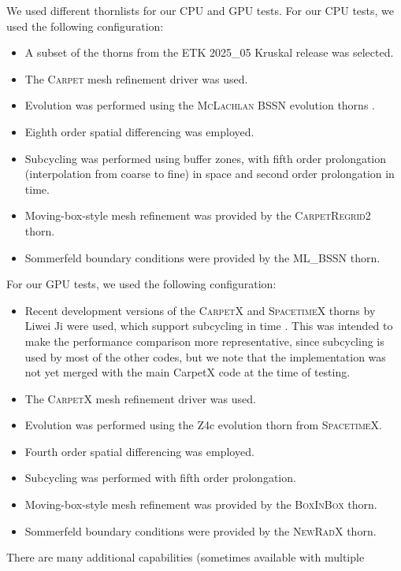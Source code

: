 \documentclass[12pt,a4paper]{article}
\numberwithin{figure}{subsection}
\newcommand{\etk}{\textsc{ETK}\xspace} %
\newcommand{\carpet}{\textsc{Carpet}\xspace}
\newcommand{\carpetx}{\textsc{CarpetX}\xspace}
\begin{document}
We used different thornlists for our CPU and GPU tests. For our CPU tests, we
used the following configuration:
\begin{itemize}
    \item A subset of the thorns from the \etk 2025\_05 Kruskal release
    \cite{EinsteinToolkit:2025_05} was selected.
    \item The \carpet mesh refinement driver was used.
    \item Evolution was performed using the \textsc{McLachlan} BSSN evolution
    thorns \cite{Brown:2008sb,Husa:2004ip}.
    \item Eighth order spatial differencing was employed.
    \item Subcycling was performed using buffer zones, with fifth order
    prolongation (interpolation from coarse to fine) in space and second order
    prolongation in time.
    \item Moving-box-style mesh refinement was provided by the
    \textsc{CarpetRegrid2} thorn.
    \item Sommerfeld boundary conditions were provided by the \textsc{ML\_BSSN}
    thorn.
\end{itemize}
For our GPU tests, we used the following configuration:
\begin{itemize}
    \item Recent development versions of the \carpetx and \textsc{SpacetimeX}
    thorns by Liwei Ji were used, which support subcycling in time \cite{Ji:2025rpd}.
    This was intended to make the performance comparison more representative,
    since subcycling is used by most of the other codes, but we note that the
    implementation was not yet merged with the main CarpetX code at the time of testing.
    \item The \carpetx mesh refinement driver was used.
    \item Evolution was performed using the Z4c evolution thorn from
    \textsc{SpacetimeX}.
    \item Fourth order spatial differencing was employed.
    \item Subcycling was performed with fifth order prolongation.
    \item Moving-box-style mesh refinement was provided by the
    \textsc{BoxInBox} thorn.
    \item Sommerfeld boundary conditions were provided by the \textsc{NewRadX}
    thorn.
\end{itemize}
There are many additional capabilities (sometimes available with multiple
\end{document}
